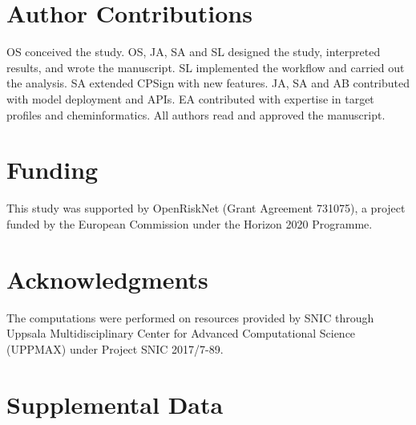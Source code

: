 \documentclass[utf8]{frontiersSCNS} %
\begin{document}
\section*{Author Contributions}
OS conceived the study. OS, JA, SA and SL designed the study, interpreted
results, and wrote the manuscript. SL implemented the workflow and carried out
the analysis. SA extended CPSign with new features. JA, SA and AB contributed
with model deployment and APIs. EA contributed with expertise in target
profiles and cheminformatics. All authors read and approved the manuscript.



\section*{Funding}
This study was supported by OpenRiskNet (Grant Agreement 731075), a project
funded by the European Commission under the Horizon 2020 Programme.

\section*{Acknowledgments}
The computations were performed on resources provided by SNIC through Uppsala
Multidisciplinary Center for Advanced Computational Science (UPPMAX) under
Project SNIC 2017/7-89.



\newpage
\appendix
\section*{Supplemental Data}
%
%
\end{document}
